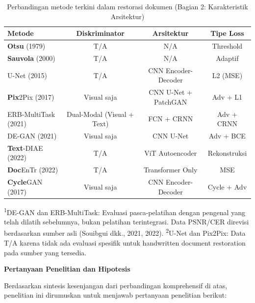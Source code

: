 \documentclass[12pt,a4paper]{book}
\begin{document}
\begin{table}[H]
\centering
\caption{Perbandingan metode terkini dalam restorasi dokumen (Bagian 2: Karakteristik Arsitektur)}
\label{tab:sota-comparison-arch}
\footnotesize
\begin{tabular}{|l|c|c|c|}
\hline
\textbf{Metode} & \textbf{Diskriminator} & \textbf{Arsitektur} & \textbf{Tipe Loss} \\ \hline
\textbf{Otsu} (1979) & T/A & N/A & Threshold \\ \hline
\textbf{Sauvola} (2000) & T/A & N/A & Adaptif \\ \hline
U-Net (2015) & T/A & CNN Encoder-Decoder & L2 (MSE) \\ \hline
\textbf{Pix}2Pix (2017) & Visual saja & CNN U-Net + PatchGAN & Adv + L1 \\ \hline
ERB-MultiTask (2021) & Dual-Modal (Visual + Text) & FCN + CRNN & Adv + CRNN \\ \hline
DE-GAN (2021) & Visual saja & CNN U-Net & Adv + BCE \\ \hline
\textbf{Text}-DIAE (2022) & T/A & ViT Autoencoder & Rekonstruksi \\ \hline
\textbf{Doc}EnTr (2022) & T/A & Transformer Only & MSE \\ \hline
\textbf{Cycle}GAN (2017) & Visual saja & CNN Encoder-Decoder & Cycle + Adv \\ \hline
\end{tabular}
\end{table}


{\footnotesize\textsuperscript{1}DE-GAN dan ERB-MultiTask: Evaluasi pasca-pelatihan dengan pengenal yang telah dilatih sebelumnya, bukan pelatihan terintegrasi. Data PSNR/CER direvisi berdasarkan sumber asli (Souibgui dkk., 2021, 2022).
\textsuperscript{2}U-Net dan Pix2Pix: Data T/A karena tidak ada evaluasi spesifik untuk handwritten document restoration pada sumber yang tersedia.}

\vspace{1ex}
\noindent\textbf{Pertanyaan Penelitian dan Hipotesis}

\vspace{0.5ex}
Berdasarkan sintesis kesenjangan dari perbandingan komprehensif di atas, penelitian ini dirumuskan untuk menjawab pertanyaan penelitian berikut:
\end{document}
